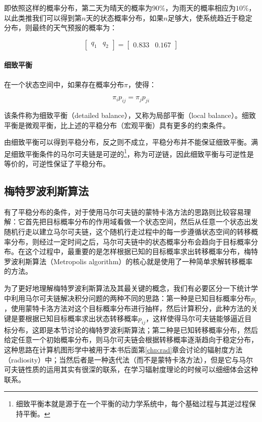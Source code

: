 \noindent 即依照这样的概率分布，第二天为晴天的概率为$90\%$，为雨天的概率相应为$10\%$，以此类推我们可以得到第$n$天的状态概率分布，如果$n$足够大，使系统趋近于稳定分布，则最终的天气预报的概率为：

\begin{equation}
	\begin{bmatrix}
		q_1&q_2
	\end{bmatrix}=\begin{bmatrix}
		0.833&0.167
	\end{bmatrix}
\end{equation}





\paragraph{细致平衡}
在一个状态空间中，如果存在概率分布$\pi$，使得：

\begin{equation}
	\pi_i p_{ij}=\pi_j p_{ji}
\end{equation}

\noindent 该条件称为细致平衡（detailed balance），又称为局部平衡（local balance）。细致平衡是微观平衡，比上述的平稳分布（宏观平衡）具有更多的约束条件。

由细致平衡可以得到平稳分布，反之则不成立，平稳分布并不能保证细致平衡。满足细致平衡条件的马尔可夫链是可逆的\footnote{细致平衡本就是源于在一个平衡的动力学系统中，每个基础过程与其逆过程保持平衡。}，称为可逆链，因此细致平衡与可逆性是等价的，可逆性保证了平稳分布。






\subsection{梅特罗波利斯算法}
有了平稳分布的条件，对于使用马尔可夫链的蒙特卡洛方法的思路则比较容易理解：它首先把目标概率分布的作用域看做一个状态空间，然后从任意一个状态出发随机行走以建立马尔可夫链，这个随机行走过程中的每一步遵循状态空间的转移概率分布，则经过一定时间之后，马尔可夫链中的状态概率分布会趋向于目标概率分布。在这个过程中，最重要的是怎样根据已知的目标概率求出转移概率分布，梅特罗波利斯算法（Metropolis algorithm）的核心就是使用了一种简单求解转移概率的方法。

为了更好地理解梅特罗波利斯算法及其最关键的概念，我们有必要区分一下统计学中利用马尔可夫链解决积分问题的两种不同的思路：第一种是已知目标概率分布$p_i$，使用蒙特卡洛方法对这个目标概率分布进行抽样，然后计算积分，此种方法的关键是要根据已知目标概率求出状态转移概率$p_{ij}$，这样使得马尔可夫链能够逼近目标分布，这即是本节讨论的梅特罗波利斯算法；第二种是已知转移概率分布，然后给定任意一个初始概率分布，则马尔可夫链会根据转移概率逐渐趋向于稳定分布，这种思路在计算机图形学中被用于本书后面第\ref{chp:rad}章会讨论的辐射度方法（radiosity）中；当然后者是一种迭代法（而不是蒙特卡洛方法），但是它与马尔可夫链性质的运用其实有很深的联系，在学习辐射度理论的时候可以细细体会这种联系。

